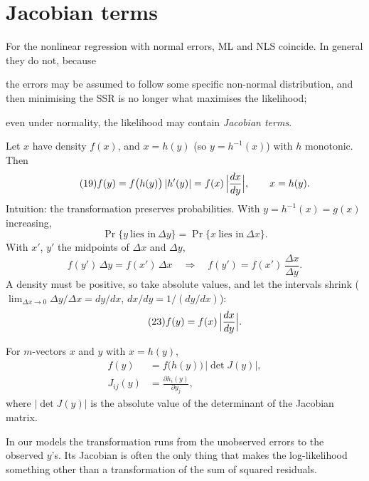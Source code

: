 \documentclass[11pt]{article}
\begin{document}
\section{Jacobian terms}

For the nonlinear regression with normal errors, ML and NLS coincide. In general they do not,
because
\begin{flatlist}
 \item[(a)] the errors may be assumed to follow some specific non-normal distribution, and then
       minimising the SSR is no longer what maximises the likelihood;
 \item[(b)] even under normality, the likelihood may contain \emph{Jacobian terms}.
\end{flatlist}

Let $x$ have density $f(x)$, and $x=h(y)$ (so $y=h^{-1}(x)$) with $h$ monotonic. Then
\begin{equation}\tag{19}
 f(y)=f\bigl(h(y)\bigr)\,\lvert h'(y)\rvert=f(x)\,\Bigl|\frac{dx}{dy}\Bigr|, \qquad x=h(y).
\end{equation}
Intuition: the transformation preserves probabilities. With $y=h^{-1}(x)=g(x)$ increasing,
\begin{equation}\tag{20}
 \Pr\{y\ \text{lies in}\ \Delta y\}=\Pr\{x\ \text{lies in}\ \Delta x\}.
\end{equation}
With $x'$, $y'$ the midpoints of $\Delta x$ and $\Delta y$,
\begin{equation}\tag{21--22}
 f(y')\,\Delta y=f(x')\,\Delta x \quad\Longrightarrow\quad f(y')=f(x')\,\frac{\Delta x}{\Delta y}.
\end{equation}
A density must be positive, so take absolute values, and let the intervals shrink
($\lim_{\Delta x\to0}\Delta y/\Delta x=dy/dx$, $dx/dy=1/(dy/dx)$):
\begin{equation}\tag{23}
 f(y)=f(x)\,\Bigl|\frac{dx}{dy}\Bigr| .
\end{equation}

For $m$-vectors $x$ and $y$ with $x=h(y)$,
\begin{align*}
 f(y)&=f\bigl(h(y)\bigr)\,\lvert\det J(y)\rvert, \tag{24}\\
 J_{ij}(y)&=\frac{\partial h_{i}(y)}{\partial y_{j}}, \tag{26}
\end{align*}
where $\lvert\det J(y)\rvert$ is the absolute value of the determinant of the Jacobian matrix.

In our models the transformation runs from the unobserved errors to the observed $y$'s. Its
Jacobian is often the only thing that makes the log-likelihood something other than a
transformation of the sum of squared residuals.
\end{document}

